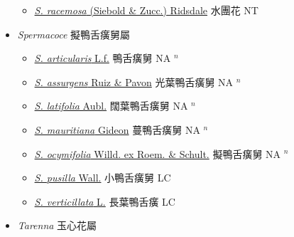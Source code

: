 \begin{itemize}
  \begin{itemize}
        \item[] \href{http://www.theplantlist.org/tpl1.1/search?q=Sinoadina+racemosa}{\textit{S. racemosa} (Siebold \& Zucc.) Ridsdale}   水團花 NT
  \end{itemize}
 \item[] \textit{Spermacoce} 擬鴨舌癀舅屬
                    
  \begin{itemize}
        \item[] \href{http://www.theplantlist.org/tpl1.1/search?q=Spermacoce+articularis}{\textit{S. articularis} L.f.}   鴨舌癀舅 NA $^n$
        \item[] \href{http://www.theplantlist.org/tpl1.1/search?q=Spermacoce+assurgens}{\textit{S. assurgens} Ruiz \& Pavon}   光葉鴨舌癀舅 NA $^n$
        \item[] \href{http://www.theplantlist.org/tpl1.1/search?q=Spermacoce+latifolia}{\textit{S. latifolia} Aubl.}   闊葉鴨舌癀舅 NA $^n$
        \item[] \href{http://www.theplantlist.org/tpl1.1/search?q=Spermacoce+mauritiana}{\textit{S. mauritiana} Gideon}   蔓鴨舌癀舅 NA $^n$
        \item[] \href{http://www.theplantlist.org/tpl1.1/search?q=Spermacoce+ocymifolia}{\textit{S. ocymifolia} Willd. ex Roem. \& Schult.}   擬鴨舌癀舅 NA $^n$
        \item[] \href{http://www.theplantlist.org/tpl1.1/search?q=Spermacoce+pusilla}{\textit{S. pusilla} Wall.}   小鴨舌癀舅 LC
        \item[] \href{http://www.theplantlist.org/tpl1.1/search?q=Spermacoce+verticillata}{\textit{S. verticillata} L.}   長葉鴨舌癀 LC
  \end{itemize}
 \item[] \textit{Tarenna} 玉心花屬
                    

\end{itemize}
